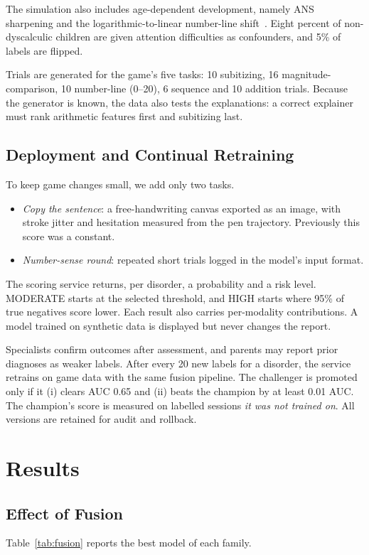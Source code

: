 \documentclass[conference]{IEEEtran}
\begin{document}
The simulation also includes age-dependent development, namely ANS sharpening and the logarithmic-to-linear
number-line shift~\cite{siegler2003numberline}. Eight percent of non-dyscalculic children are given attention
difficulties as confounders, and 5\% of labels are flipped.

Trials are generated for the game's five tasks: 10 subitizing, 16 magnitude-comparison, 10 number-line (0--20),
6 sequence and 10 addition trials. Because the generator is known, the data also tests the explanations: a correct
explainer must rank arithmetic features first and subitizing last.

\subsection{Deployment and Continual Retraining}\label{sec:deploy}
To keep game changes small, we add only two tasks.
\begin{itemize}
  \item \emph{Copy the sentence}: a free-handwriting canvas exported as an image, with stroke jitter and hesitation
        measured from the pen trajectory. Previously this score was a constant.
  \item \emph{Number-sense round}: repeated short trials logged in the model's input format.
\end{itemize}

The scoring service returns, per disorder, a probability and a risk level. MODERATE starts at the selected
threshold, and HIGH starts where 95\% of true negatives score lower. Each result also carries per-modality
contributions. A model trained on synthetic data is displayed but never changes the report.

Specialists confirm outcomes after assessment, and parents may report prior diagnoses as weaker labels. After every
20 new labels for a disorder, the service retrains on game data with the same fusion pipeline. The challenger is
promoted only if it (i) clears AUC 0.65 and (ii) beats the champion by at least 0.01 AUC. The champion's score is
measured on labelled sessions \emph{it was not trained on}. All versions are retained for audit and rollback.

\section{Results}

\subsection{Effect of Fusion}
Table~\ref{tab:fusion} reports the best model of each family.
\end{document}
